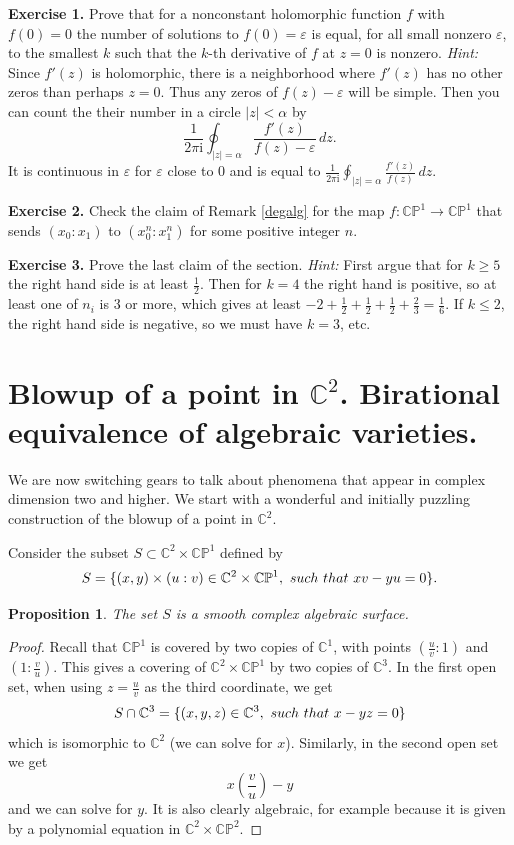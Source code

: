 \documentclass[11pt]{article}
\numberwithin{equation}{section}
\numberwithin{footnote}{section}
\newtheorem{prop}[thm]{Proposition}
\newcommand{\blue}{\color{blue}}
\newcommand{\ii}{{\mathrm i}}
\renewcommand{\P}{{\mathbb P}}
\newcommand{\C}{{\mathbb C}}
\begin{document}
{\bf Exercise 1.} Prove that for a nonconstant holomorphic function $f$ with $f(0)=0$ the number of solutions to $f(0)=\varepsilon$ is equal, for all small nonzero $\varepsilon$, to the smallest $k$ such that the $k$-th derivative of $f$ at $z=0$ is nonzero. \emph{Hint:} Since $f'(z)$ is holomorphic, there is a neighborhood where $f'(z)$ has no other zeros than perhaps $z=0$. Thus any zeros of $f(z)-\varepsilon$ will be simple. Then you can count the their number in a circle $|z|<\alpha$ by 
$$
\frac 1{2\pi\ii} \oint_{|z|=\alpha} \frac {f'(z)}{f(z)-\varepsilon}\,dz.
$$
It is continuous in $\varepsilon$ for $\varepsilon$ close to $0$ and is equal to $
\frac 1{2\pi\ii} \oint_{|z|=\alpha} \frac {f'(z)}{f(z)}\,dz.
$

{\bf Exercise 2.} Check the claim of Remark \ref{degalg} for the map $f:\C\P^1\to\C\P^1$ that sends $(x_0:x_1)$ to $(x_0^n:x_1^n)$ for some positive integer $n$.

{\bf Exercise 3.} Prove the last claim of the section. \emph{Hint:} First argue that for $k\geq 5$ the right hand side is at least $\frac 12$. Then for $k=4$ the right hand is positive, so at least one of $n_i$ is $3$ or more, which gives at least $-2+\frac 12 +\frac 12 +\frac 12 + \frac 23 = \frac 16$. If $k\leq 2$, the right hand side is negative, so we must have $k=3$, etc.


\section{Blowup of a point in $\C^2$. Birational equivalence of algebraic varieties.}\label{sec.blowup}
We are now switching gears to talk about phenomena that appear in complex dimension two and higher.
We start with a wonderful and initially puzzling construction of the {\blue blowup} of a point in $\C^2$.

\smallskip
Consider the subset $S\subset \C^2 \times \C\P^1$ defined by
$$
S = \{(x,y)\times(u:v) \in  \C^2 \times \C\P^1, {\rm~such~that~}xv-yu = 0\}.
$$
\begin{prop}
The set $S$ is a smooth complex algebraic surface.
\end{prop}

\begin{proof}
Recall that $\C\P^1$ is covered by two copies of $\C^1$, with points $(\frac uv:1)$ and $(1:\frac vu)$. This gives a covering of 
$\C^2\times \C\P^1$ by two copies of $\C^3$. In the first open set, when using $z=\frac uv$ as the third coordinate, we get
$$
S\cap \C^3=\{(x,y,z)\in \C^3,{\rm ~such~that~}x - y z =0\}
$$
which is  isomorphic to $\C^2$ (we can solve for $x$). Similarly, in the second open set we get
$$
x \left(\frac vu\right) - y
$$
and we can solve for $y$.
It is also clearly algebraic, for example because it is given by a polynomial equation in $\C^2\times \C\P^2$.
\end{proof}
\end{document}

